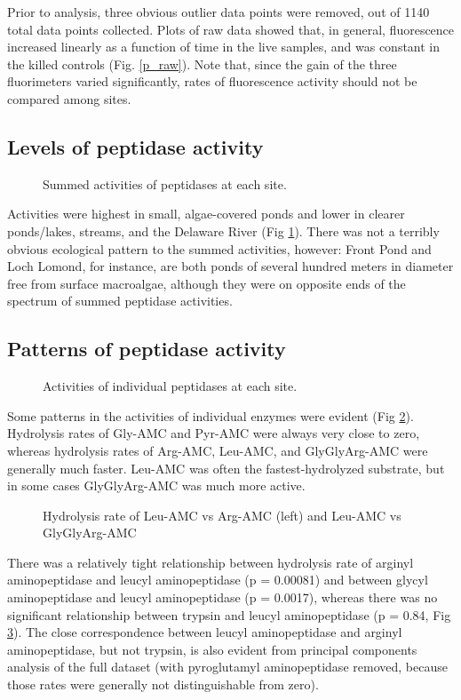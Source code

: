 \documentclass{article}
\begin{document}
    Prior to analysis, three obvious outlier data points were removed, out of 1140 total data points collected. Plots of raw data showed that, in general, fluorescence increased linearly as a function of time in the live samples, and was constant in the killed controls (Fig. \ref{p_raw}). Note that, since the gain of the three fluorimeters varied significantly, rates of fluorescence activity should not be compared among sites.
    
    \subsection{Levels of peptidase activity}
    \begin{figure}
    \caption{Summed activities of peptidases at each site. \label{p_summed}}
    \end{figure}
    
    Activities were highest in small, algae-covered ponds and lower in clearer ponds/lakes, streams, and the Delaware River (Fig \ref{p_summed}). There was not a terribly obvious ecological pattern to the summed activities, however: Front Pond and Loch Lomond, for instance, are both ponds of several hundred meters in diameter free from surface macroalgae, although they were on opposite ends of the spectrum of summed peptidase activities.
    
    \subsection{Patterns of peptidase activity}
    \begin{figure}
    \centering
    \caption{Activities of individual peptidases at each site. \label{p_v0}}
    \end{figure}
    Some patterns in the activities of individual enzymes were evident (Fig \ref{p_v0}). Hydrolysis rates of Gly-AMC and Pyr-AMC were always very close to zero, whereas hydrolysis rates of Arg-AMC, Leu-AMC, and GlyGlyArg-AMC were generally much faster. Leu-AMC was often the fastest-hydrolyzed substrate, but in some cases GlyGlyArg-AMC was much more active.
    
    \begin{figure}
    \centering
    \caption{Hydrolysis rate of Leu-AMC vs Arg-AMC (left) and Leu-AMC vs GlyGlyArg-AMC \label{leu.vs.others}}
    \end{figure}
    
    There was a relatively tight relationship between hydrolysis rate of arginyl aminopeptidase and leucyl aminopeptidase (p = 0.00081) and between glycyl aminopeptidase and leucyl aminopeptidase (p = 0.0017), whereas there was no significant relationship between trypsin and leucyl aminopeptidase (p = 0.84, Fig \ref{leu.vs.others}). The close correspondence between leucyl aminopeptidase and arginyl aminopeptidase, but not trypsin, is also evident from principal components analysis of the full dataset (with pyroglutamyl aminopeptidase removed, because those rates were generally not distinguishable from zero). 
    
\end{document}
